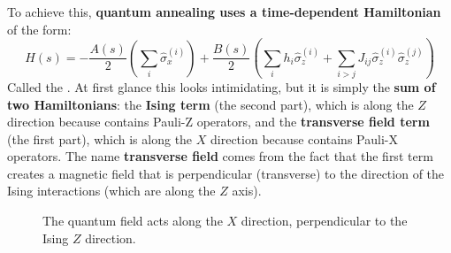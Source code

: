 \highspace
To achieve this, \textbf{quantum annealing uses a time-dependent Hamiltonian} of the form:
\begin{equation}\label{eq:annealing-hamiltonian}
    H(s) = -\frac{A(s)}{2} \left( \sum_i \hat{\sigma}_{x}^{(i)} \right) + \frac{B(s)}{2} \left( \sum_i h_i \hat{\sigma}_{z}^{(i)} + \sum_{i > j} J_{ij} \hat{\sigma}_{z}^{(i)} \hat{\sigma}_{z}^{(j)} \right)
\end{equation}
Called the . At first glance this looks intimidating, but it is simply the \textbf{sum of two Hamiltonians}: the \textbf{Ising term} (the second part), which is along the $Z$ direction because contains Pauli-Z operators, and the \textbf{transverse field term} (the first part), which is along the $X$ direction because contains Pauli-X operators. The name \textbf{transverse field} comes from the fact that the first term creates a magnetic field that is perpendicular (transverse) to the direction of the Ising interactions (which are along the $Z$ axis).

\newpage

\begin{figure}[!ht]
    \centering
    \caption{The quantum field acts along the $X$ direction, perpendicular to the Ising $Z$ direction.}
\end{figure}

